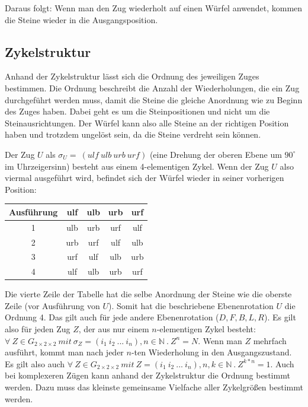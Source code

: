 \documentclass[12pt,a4paper, usenames, dvipsnames]{article}
\newcommand{\Gtwo}{\ensuremath{G_{2\times 2\times 2}}}
\begin{document}
Daraus folgt: Wenn man den Zug wiederholt auf einen Würfel anwendet, kommen die Steine wieder in die Ausgangsposition.
 
%
%
%
%
%
%
%
%
%
%
%
%
%
%
%
%
%
%
%
%


\subsection*{Zykelstruktur}


Anhand der Zykelstruktur lässt sich die Ordnung des jeweiligen Zuges bestimmen. Die Ordnung beschreibt die Anzahl der Wiederholungen, die ein Zug durchgeführt werden muss, damit die Steine die gleiche Anordnung wie zu Beginn des Zuges haben. Dabei geht es um die Steinpositionen und nicht um die Steinausrichtungen.
Der Würfel kann also alle Steine an der richtigen Position haben und trotzdem ungelöst sein, da die Steine verdreht sein können. 

Der Zug $U$ als $\sigma_U =\ (ulf \ ulb \ urb \ urf) $ (eine Drehung der oberen Ebene um $90^\circ$ im Uhrzeigersinn) besteht aus einem 4-elementigen Zykel.
Wenn der Zug $U$ also viermal ausgeführt wird, befindet sich der Würfel wieder in seiner vorherigen Position: 
\begin{center}
\centering
\begin{tabular}{ccccc}
\toprule
\textbf{Ausführung} & \textbf{ulf} & \textbf{ulb} & \textbf{urb} & \textbf{urf} \\
\midrule
1 & ulb & urb & urf & ulf \\

2 & urb & urf & ulf & ulb \\

3 & urf & ulf & ulb & urb \\

4 & ulf & ulb & urb & urf \\
\bottomrule
\end{tabular}
\end{center}

Die vierte Zeile der Tabelle hat die selbe Anordnung der Steine wie die oberste Zeile (vor Ausführung von $U$). 
Somit hat die beschriebene Ebenenrotation $U$ die Ordnung 4. Das gilt auch für jede andere Ebenenrotation ($D, F, B, L, R$).
Es gilt also für jeden Zug $Z$, der aus nur einem $n$-elementigen Zykel besteht: \\ 
${\forall \ Z \in \Gtwo\ mit \ \sigma_Z=(i_1 \ i_2 \ ... \ i_n), n \in \mathbb{N} \ . \  Z^n=N }$. 
Wenn man $Z$ mehrfach ausführt, kommt man nach jeder $n$-ten Wiederholung in den Ausgangszustand. \cite{TD} 
Es gilt also auch 
${\forall \ Z \in \Gtwo\ mit \ Z=(i_1 \ i_2 \ ... \ i_n), n,k \in \mathbb{N} \ . \  Z^{k*n}=1 }$.
Auch bei komplexeren Zügen kann anhand der Zykelstruktur die Ordnung bestimmt werden. Dazu muss das kleinste gemeinsame Vielfache aller Zykelgrößen bestimmt werden. \cite{TD}
\end{document}
